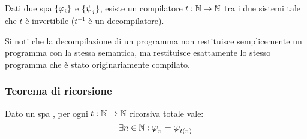 \begin{theorem}
    Dati due spa $\sistProg$ e $\sistProgW$, esiste un compilatore $t:\mathbb{N}\to\mathbb{N}$ tra
    i due sistemi tale che $t$ è invertibile ($t^{-1}$ è un decompilatore).
\end{theorem}

Si noti che la decompilazione di un programma non restituisce semplicemente un
programma con la stessa semantica, ma restituisce esattamente lo stesso programma
che è stato originariamente compilato.

\subsubsection{Teorema di ricorsione}
\begin{theorem}\label{theo:ric}
    Dato un spa \sistProg, per ogni $t:\mathbb{N}\to\mathbb{N}$ ricorsiva totale vale:
    $$ \exists n\in\N:\semRAM_n=\semRAM_{t(n)} $$
\end{theorem}

